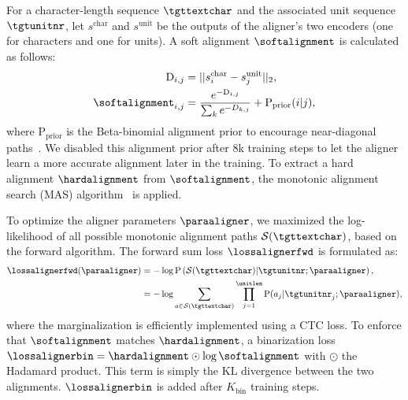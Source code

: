 For a character-length sequence $\tgttextchar$ and the associated unit sequence $\tgtunitnr$, let $s^\text{char}$ and $s^\text{unit}$ be the outputs of the aligner's two encoders (one for characters and one for units).
A soft alignment 
$\softalignment$ is calculated as follows:
\begin{align}
    \textrm{D}_{i,j} & = ||s^{\text{char}}_{i} - s^{\text{unit}}_{j}||_{2}, \\
    \softalignment_{i,j} & = \frac{e^{-\textrm{D}_{i,j}}}{\sum_{k}{e^{-D_{k,j}}}} + \textrm{P}_{\text{prior}}(i|j),
\end{align}
where $\textrm{P}_{\text{prior}}$ is the Beta-binomial alignment prior to encourage near-diagonal paths~\citep{shih2021rad}.
We disabled this alignment prior after 8k training steps to let the aligner learn a more accurate alignment later in the training.
To extract a hard alignment $\hardalignment$ from $\softalignment$, the monotonic alignment search (MAS) algorithm~\citep{kim2020glow} is applied. 

To optimize the aligner parameters $\paraaligner$, we maximized the log-likelihood of all possible monotonic alignment paths $\mathcal S(\tgttextchar)$, based on the forward algorithm.
The forward sum loss $\lossalignerfwd$ is formulated as:
\begin{align}\label{eq:fwd_sum_loss}
    \begin{split}
    \lossalignerfwd(\paraaligner) 
    & = - \log \textrm{P}\left(\mathcal S(\tgttextchar)|\tgtunitnr; \paraaligner\right), \\
    & = - \log \sum_{a \in \mathcal S(\tgttextchar)} \prod_{j=1}^{\unitlen} \textrm{P}(a_{j}|\tgtunitnr_{j}; \paraaligner),
    \end{split}
\end{align}
where the marginalization is efficiently implemented using a CTC loss.
To enforce that $\softalignment$ matches $\hardalignment$, a binarization loss $\lossalignerbin = \hardalignment \odot \log \softalignment$ with $\odot$ the Hadamard product.
This term is simply the KL divergence between the two alignments.
$\lossalignerbin$ is added after $K_{\text{bin}}$ training steps.

